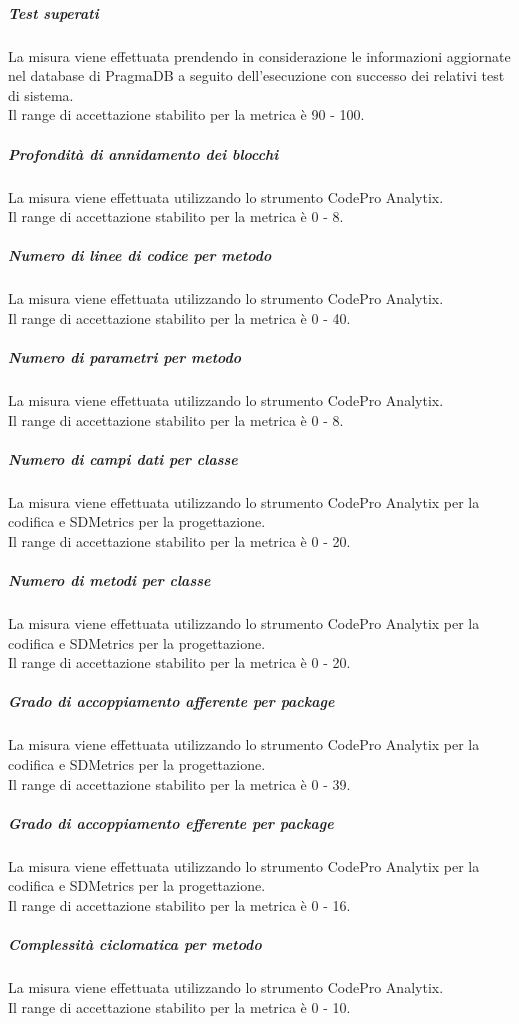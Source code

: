 			\subparagraph{Test superati}
			La misura viene effettuata prendendo in considerazione le informazioni aggiornate nel database di PragmaDB a seguito dell'esecuzione con successo dei relativi test di sistema.
			\\Il range di accettazione stabilito per la metrica è 90 - 100.
			
			\subparagraph{Profondità di annidamento dei blocchi}
			La misura viene effettuata utilizzando lo strumento CodePro Analytix.
			\\Il range di accettazione stabilito per la metrica è 0 - 8.
			
			\subparagraph{Numero di linee di codice per metodo}
			La misura viene effettuata utilizzando lo strumento CodePro Analytix.
			\\Il range di accettazione stabilito per la metrica è 0 - 40.
			
			\subparagraph{Numero di parametri per metodo}
			La misura viene effettuata utilizzando lo strumento CodePro Analytix.
			\\Il range di accettazione stabilito per la metrica è 0 - 8.
			
			\subparagraph{Numero di campi dati per classe}
			La misura viene effettuata utilizzando lo strumento CodePro Analytix per la codifica e SDMetrics per la progettazione.
			\\Il range di accettazione stabilito per la metrica è 0 - 20.
			
			\subparagraph{Numero di metodi per classe}
			La misura viene effettuata utilizzando lo strumento CodePro Analytix per la codifica e SDMetrics per la progettazione.
			\\Il range di accettazione stabilito per la metrica è 0 - 20.
			
			\subparagraph{Grado di accoppiamento afferente per package}
			La misura viene effettuata utilizzando lo strumento CodePro Analytix per la codifica e SDMetrics per la progettazione.
			\\Il range di accettazione stabilito per la metrica è 0 - 39.
			
			\subparagraph{Grado di accoppiamento efferente per package}
			La misura viene effettuata utilizzando lo strumento CodePro Analytix per la codifica e SDMetrics per la progettazione.
			\\Il range di accettazione stabilito per la metrica è 0 - 16.
			
			\subparagraph{Complessità ciclomatica per metodo}
			La misura viene effettuata utilizzando lo strumento CodePro Analytix.
			\\Il range di accettazione stabilito per la metrica è 0 - 10.
			
